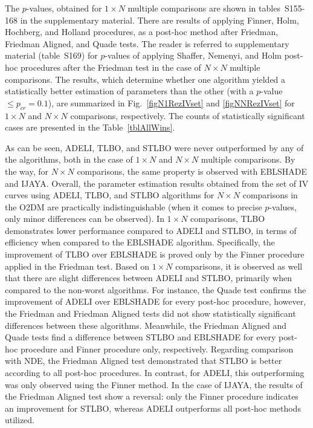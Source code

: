 \documentclass[a4paper,fleqn]{cas-dc}
\begin{document}

The $p$-values, obtained for $1\times N$ multiple comparisons are shown in tables~S155-168 in the supplementary material.
There are results of applying  Finner, Holm, Hochberg, and Holland procedures,
as a post-hoc method after Friedman, Friedman Aligned, and Quade tests.
The reader is referred to supplementary material (table~S169) for $p$-values of
applying  Shaffer, Nemenyi, and Holm post-hoc procedures after the Friedman test in the
case of $N\times N$ multiple comparisons.
The results, which determine whether one algorithm yielded a statistically better estimation of parameters
than the other (with a $p$-value $\leq p_{cr}=0.1$), are summarized in Fig.~\ref{figN1RezIVset} and \ref{figNNRezIVset}
for $1\times N$ and $N\times N$ comparisons, respectively.
The counts of statistically  significant cases are presented in the Table~\ref{tblAllWins}.

As can be seen,
ADELI, TLBO, and STLBO were never outperformed by any of the algorithms,
both in the case of $1\times N$ and $N\times N$ multiple comparisons.
By the way, for $N\times N$ comparisons, the same property is observed with EBLSHADE and IJAYA.
Overall, the parameter estimation results obtained from the set of IV curves
using ADELI, TLBO, and STLBO algorithms for $N\times N$ comparisons in the O2DM are practically indistinguishable
(when it comes to precise $p$-values, only minor differences can be observed).
In $1\times N$ comparisons, TLBO demonstrates lower performance compared to ADELI and STLBO,
in terms of efficiency when compared to the EBLSHADE algorithm.
Specifically, the improvement of TLBO over EBLSHADE is proved only by the Finner procedure applied in the Friedman test.
Based on $1\times N$ comparisons, it is observed as well that there are slight differences between ADELI and STLBO,
primarily when compared to the non-worst algorithms.
For instance, the Quade test confirms the improvement of ADELI over EBLSHADE for every post-hoc procedure,
however, the Friedman and Friedman Aligned tests did not show statistically significant differences between these algorithms.
Meanwhile, the Friedman Aligned and Quade tests find a difference between STLBO and EBLSHADE
for every post-hoc procedure and Finner procedure only, respectively.
Regarding comparison with NDE, the Friedman Aligned test demonstrated that STLBO is better according to all post-hoc procedures.
In contrast, for ADELI, this outperforming was only observed using the Finner method.
In the case of IJAYA,
the results of the Friedman Aligned test show a reversal:
only the Finner procedure indicates an improvement for STLBO,
whereas ADELI outperforms all post-hoc methods utilized.
\end{document}
